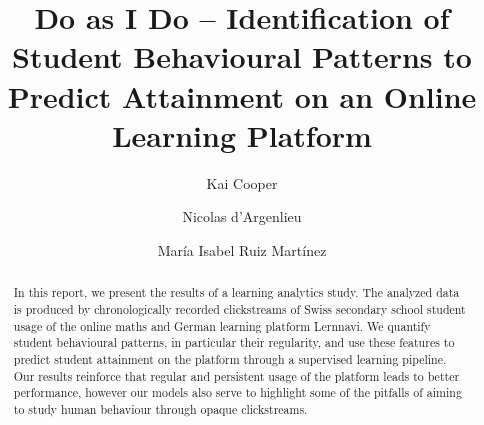 \documentclass[sigplan,screen]{acmart}
\begin{document}
\title[Do As I Do]{Do as I Do -- Identification of Student Behavioural Patterns to Predict Attainment on an Online Learning Platform}

\author{Kai Cooper}

\author{Nicolas d'Argenlieu}
\authornotemark[1]

\author{Mar\'ia Isabel Ruiz Mart\'inez}
\authornotemark[1]


\renewcommand{\shortauthors}{Cooper et al.}

\begin{abstract}
In this report, we present the results of a learning analytics study. The analyzed data is produced by chronologically recorded clickstreams of Swiss secondary school student usage of the online maths and German learning platform Lernnavi. We quantify student behavioural patterns, in particular their regularity, and use these features to predict student attainment on the platform through a supervised learning pipeline. Our results reinforce that regular and persistent usage of the platform leads to better performance, however our models also serve to highlight some of the pitfalls of aiming to study human behaviour through opaque clickstreams. 
\end{abstract}
\end{document}
